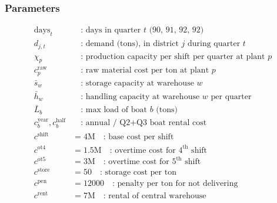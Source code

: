 \documentclass[10pt]{article}
\begin{document}
\subsubsection{Parameters}
\begin{align}
    \text{days}_t&\quad\text{: days in quarter $t $ (90, 91, 92, 92)}\\
    d_{j, t}&\quad\text{: demand (tons), in district $j $ during quarter $t $}\\
    \chi_p&\quad\text{: production capacity per shift per quarter at plant $p $}\\
    c_p^{\text{raw}}&\quad\text{: raw material cost per ton at plant $p $}\\
    \bar{s}_w&\quad\text{: storage capacity at warehouse $w $}\\
    \bar{h}_w&\quad\text{: handling capacity at warehouse $w $ per quarter}\\
    \bar{L}_b&\quad\text{: max load of boat $b $ (tons)}\\
    c^{\text{year}}_b, c^{\text{half}}_b&\quad\text{: annual / Q2+Q3 boat rental cost}\\
    c^{\text{shift}}&=4\text{M}\quad\text{: base cost per shift}\\
    c^{\text{ot4}} &= 1.5\text{M}\quad\text{: overtime cost for $4^{\text{th}} $ shift}\\
    c^{\text{ot5}} &= 3\text{M}\quad\text{: overtime cost for $5^{\text{th}} $ shift}\\
    c^{\text{store}}&= 50\quad\text{: storage cost per ton}\\
    c^{\text{pen}}&= 12000\quad\text{: penalty per ton for not delivering}\\
    c^{\text{rent}}&= 7\text{M}\quad\text{: rental of central warehouse}
\end{align}
\newpage 
\end{document}
